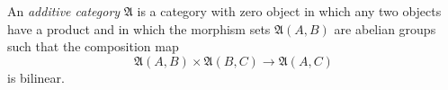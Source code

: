 An \textit{additive category} $\mathfrak{A}$ is a category with zero object in which any two objects have a product and in which the morphism sets $\mathfrak{A}(A, B)$ are abelian groups such that the composition map
$$
\mathfrak{A}(A, B) \times \mathfrak{A}(B, C) \to \mathfrak{A}(A, C)
$$
is bilinear.

